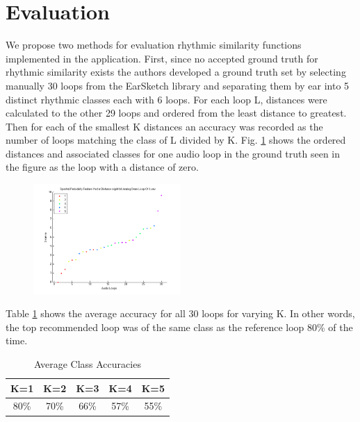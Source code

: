 \documentclass{article}
\begin{document}
\section{Evaluation}
We propose two methods for evaluation rhythmic similarity functions implemented in the application. First, since no accepted ground truth for rhythmic similarity exists the authors developed a ground truth set by selecting manually 30 loops from the EarSketch library and separating them by ear into 5 distinct rhythmic classes each with 6 loops. For each loop L, distances were calculated to the other 29 loops and ordered from the least distance to greatest. Then for each of the smallest K distances an accuracy was recorded as the number of loops matching the class of L divided by K. Fig. \ref{fig:eval1_dist} shows the ordered distances and associated classes for one audio loop in the ground truth seen in the figure as the loop with a distance of zero.

\begin{figure}[h!]
  \centering
    \includegraphics[width=0.5\textwidth]{distance_graph_eval1.png}
      \caption{}\label{fig:eval1_dist}
\end{figure}

Table \ref{tab:bs_eval} shows the average accuracy for all 30 loops for varying K. In other words, the top recommended loop was of the same class as the reference loop 80\% of the time.

\begin{table}[h!]
  \begin{center}
    \begin{tabular}{| c | c | c | c | c |}
    \hline
    K=1 & K=2 & K=3 & K=4 & K=5 \\
    \hline
    80\% & 70\% & 66\%  & 57\% & 55\% \\
    \hline
    \end{tabular}
  \end{center}
  \caption{Average Class Accuracies}\label{tab:bs_eval}
\end{table}
\end{document}
